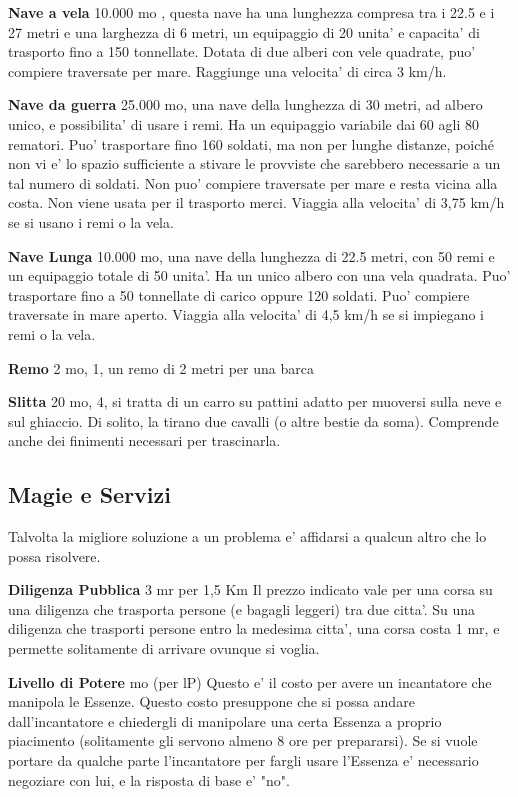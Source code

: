 \documentclass[a4paper,11pt,twoside,openany]{book}
\begin{document}
{\textbf{Nave a vela} 10.000 mo , questa nave ha una lunghezza compresa tra i 22.5 e i 27 metri e una larghezza di 6 metri, un equipaggio di 20 unita' e capacita' di trasporto fino a 150 tonnellate. Dotata di due alberi con vele quadrate, puo' compiere traversate per mare. Raggiunge una velocita' di circa 3 km/h. 

\textbf{Nave da guerra} 25.000 mo, una nave della lunghezza di 30 metri, ad albero unico, e possibilita' di usare i remi. Ha un equipaggio variabile dai 60 agli 80 rematori. Puo' trasportare fino 160 soldati, ma non per lunghe distanze, poiché non vi e' lo spazio sufficiente a stivare le provviste che sarebbero necessarie a un tal numero di soldati. Non puo' compiere traversate per mare e resta vicina alla costa. Non viene usata per il trasporto merci. Viaggia alla velocita' di 3,75 km/h se si usano i remi o la vela.

\textbf{Nave Lunga} 10.000 mo, una nave della lunghezza di 22.5 metri, con 50 remi e un equipaggio totale di 50 unita'. Ha un unico albero con una vela quadrata. Puo' trasportare fino a 50 tonnellate di carico oppure 120 soldati. Puo' compiere traversate in mare aperto. Viaggia alla velocita' di 4,5 km/h se si impiegano i remi o la vela.

\textbf{Remo} 2 mo, 1, un remo di 2 metri per una barca

\textbf{Slitta} 20 mo, 4, si tratta di un carro su pattini adatto per muoversi sulla neve e sul ghiaccio. Di solito, la tirano due cavalli (o altre bestie da soma). Comprende anche dei finimenti necessari per trascinarla.

\pagebreak

\subsection{Magie e Servizi}

\label{magie-e-servizi}

Talvolta la migliore soluzione a un problema e' affidarsi a qualcun altro che lo possa risolvere.

\textbf{Diligenza Pubblica} 3 mr per 1,5 Km Il prezzo indicato vale per una corsa su una diligenza che trasporta persone (e bagagli leggeri) tra due citta'. Su una diligenza che trasporti persone entro la medesima citta', una corsa costa 1 mr, e permette solitamente di arrivare ovunque si voglia.

\textbf{Livello di Potere}  mo (per lP) Questo e' il costo per avere un incantatore che manipola le Essenze. Questo costo presuppone che si possa andare dall'incantatore e chiedergli di manipolare una certa Essenza a proprio piacimento (solitamente gli servono almeno 8 ore per prepararsi). Se si vuole portare da qualche parte l'incantatore per fargli usare l'Essenza e' necessario negoziare con lui, e la risposta di base e' "no".

}
\end{document}

